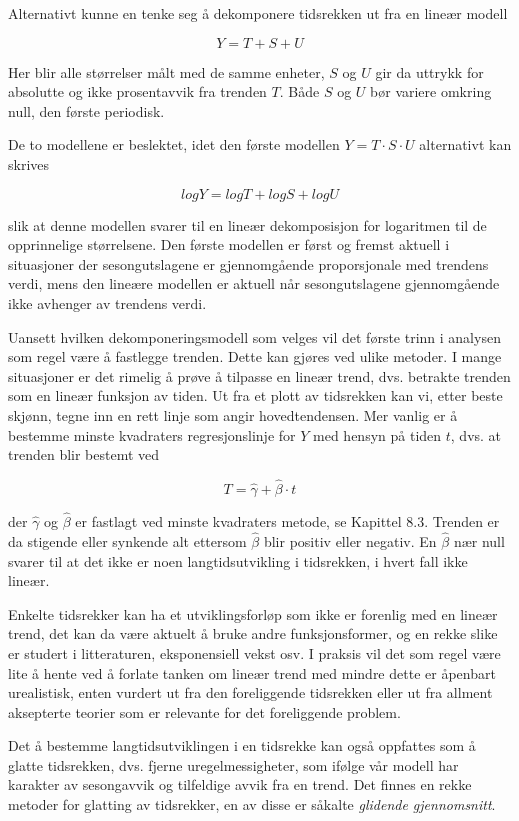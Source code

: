 Alternativt kunne en tenke seg å dekomponere tidsrekken ut fra en
lineær modell

\[     Y = T + S + U    \]

\noindent Her blir alle størrelser målt med de samme enheter, $S$ og
$U$ gir da uttrykk for absolutte og ikke prosentavvik fra trenden $T$. 
Både $S$ og $U$ bør variere omkring null, den første periodisk.

De to modellene er beslektet, idet den første modellen $Y = T \cdot S 
\cdot U$ alternativt kan skrives

\[ logY=logT+logS+logU \]

\noindent slik at denne modellen svarer til en lineær dekomposisjon for 
logaritmen til de opprinnelige størrelsene.  Den første modellen er 
først og fremst aktuell i situasjoner der sesongutslagene er 
gjennomgående proporsjonale med trendens verdi, mens den lineære
modellen er aktuell når sesongutslagene gjennomgående ikke avhenger
av trendens verdi.

Uansett hvilken dekomponeringsmodell som velges vil det første trinn i
analysen som regel være å fastlegge trenden.  Dette kan gjøres ved
ulike metoder.  I mange situasjoner er det rimelig å prøve å
tilpasse en lineær trend, dvs. betrakte trenden som en lineær
funksjon av tiden.  Ut fra et plott av tidsrekken kan vi, etter beste 
skjønn, tegne inn en rett linje som angir hovedtendensen.  Mer vanlig er 
å bestemme minste kvadraters regresjonslinje for $Y$ med hensyn på
tiden $t$, dvs. at trenden blir bestemt ved

\[    T = \hat{\gamma} + \hat{\beta} \cdot t  \]

\noindent der $\hat{\gamma}$ og $\hat{\beta}$ er fastlagt ved minste
kvadraters metode, se Kapittel 8.3. Trenden er da stigende eller synkende alt
ettersom $\hat{\beta}$ blir positiv eller negativ. En $\hat{\beta}$ nær null
svarer til at det ikke er noen langtidsutvikling i tidsrekken, i hvert fall
ikke lineær.

Enkelte tidsrekker kan ha et utviklingsforløp som ikke er forenlig med
en lineær trend, det kan da være aktuelt å bruke andre 
funksjonsformer, og en rekke slike er studert i litteraturen, eksponensiell
vekst osv.  I praksis vil det som regel være lite å hente ved å
forlate tanken om lineær trend med mindre dette er åpenbart 
urealistisk, enten vurdert ut fra den foreliggende tidsrekken eller ut fra
allment aksepterte teorier som er relevante for det foreliggende problem.

Det å bestemme langtidsutviklingen i en tidsrekke kan også oppfattes
som å glatte tidsrekken, dvs. fjerne uregelmessigheter, som ifølge
vår mo\-dell har karakter av sesongavvik og tilfeldige avvik fra en trend.
Det finnes en rekke metoder for glatting av tidsrekker, en av disse er
såkalte {\em glidende gjennomsnitt}.\\

